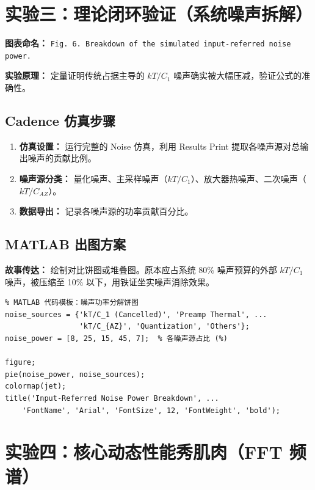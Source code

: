 \documentclass[11pt,a4paper,UTF8]{ctexart}
\begin{document}
\section{实验三：理论闭环验证（系统噪声拆解）}

\textbf{图表命名：} \texttt{Fig. 6. Breakdown of the simulated input-referred noise power.}

\textbf{实验原理：} 定量证明传统占据主导的 $kT/C_1$ 噪声确实被大幅压减，验证公式的准确性。

\subsection{Cadence 仿真步骤}

\begin{enumerate}[leftmargin=*]
    \item \textbf{仿真设置：} 运行完整的 Noise 仿真，利用 Results Print 提取各噪声源对总输出噪声的贡献比例。
    
    \item \textbf{噪声源分类：} 量化噪声、主采样噪声（$kT/C_1$）、放大器热噪声、二次噪声（$kT/C_{AZ}$）。
    
    \item \textbf{数据导出：} 记录各噪声源的功率贡献百分比。
\end{enumerate}

\subsection{MATLAB 出图方案}

\textbf{故事传达：} 绘制对比饼图或堆叠图。原本应占系统 80\% 噪声预算的外部 $kT/C_1$ 噪声，被压缩至 10\% 以下，用铁证坐实噪声消除效果。

\begin{lstlisting}
% MATLAB 代码模板：噪声功率分解饼图
noise_sources = {'kT/C_1 (Cancelled)', 'Preamp Thermal', ...
                 'kT/C_{AZ}', 'Quantization', 'Others'};
noise_power = [8, 25, 15, 45, 7];  % 各噪声源占比 (%)

figure;
pie(noise_power, noise_sources);
colormap(jet);
title('Input-Referred Noise Power Breakdown', ...
    'FontName', 'Arial', 'FontSize', 12, 'FontWeight', 'bold');
\end{lstlisting}

\section{实验四：核心动态性能秀肌肉（FFT 频谱）}
\end{document}

